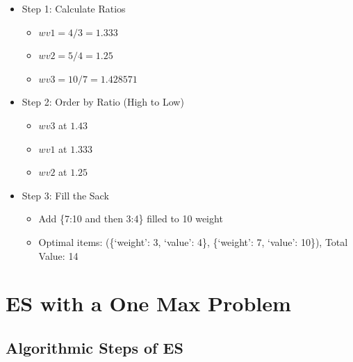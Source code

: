 \documentclass[
  letterpaper,
  DIV=11,
  numbers=noendperiod]{scrreprt}
\providecommand{\tightlist}{%
  \setlength{\itemsep}{0pt}\setlength{\parskip}{0pt}}\usepackage{longtable,booktabs,array}
\begin{document}
\begin{itemize}
\tightlist
\item
  Step 1: Calculate Ratios

  \begin{itemize}
  \tightlist
  \item
    \(wv1 = 4/3 = 1.333\)
  \item
    \(wv2 = 5/4 = 1.25\)
  \item
    \(wv3 = 10/7 = 1.428571\)
  \end{itemize}
\item
  Step 2: Order by Ratio (High to Low)

  \begin{itemize}
  \tightlist
  \item
    \(wv3\) at \(1.43\)
  \item
    \(wv1\) at \(1.333\)
  \item
    \(wv2\) at \(1.25\)
  \end{itemize}
\item
  Step 3: Fill the Sack

  \begin{itemize}
  \tightlist
  \item
    Add \{7:10 and then 3:4\} filled to 10 weight
  \item
    Optimal items: (\{`weight': 3, `value': 4\}, \{`weight': 7, `value':
    10\}), Total Value: 14
  \end{itemize}
\end{itemize}


\chapter{ES with a One Max Problem}\label{es-with-a-one-max-problem}

\section{Algorithmic Steps of ES}\label{algorithmic-steps-of-es}
\end{document}
